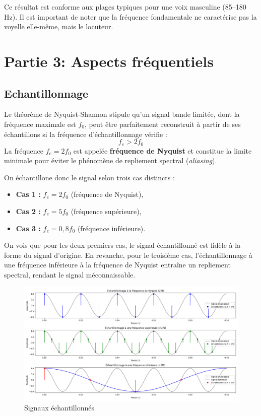 Ce résultat est conforme aux plages typiques pour une voix masculine (85–180 Hz). 
Il est important de noter que la fréquence fondamentale ne caractérise pas la voyelle elle-même, mais le locuteur.


\newpage
\section{Partie 3: Aspects fréquentiels}
\subsection{Echantillonnage}


Le théorème de Nyquist-Shannon stipule qu’un signal bande limitée, dont la fréquence maximale est $f_0$, peut être parfaitement reconstruit à partir de ses échantillons si la fréquence d’échantillonnage vérifie :
\[
f_e > 2 f_0
\]
La fréquence $f_e = 2 f_0$ est appelée \textbf{fréquence de Nyquist} et constitue la limite minimale pour éviter le phénomène de repliement spectral (\textit{aliasing}).

On échantillone donc le signal selon trois cas distincts :

\begin{itemize}
    \item \textbf{Cas 1 :} $f_e = 2f_0$ (fréquence de Nyquist),
    \item \textbf{Cas 2 :} $f_e = 5f_0$ (fréquence supérieure),
    \item \textbf{Cas 3 :} $f_e = 0{,}8f_0$ (fréquence inférieure).
\end{itemize}

On vois que pour les deux premiers cas, le signal échantillonné est fidèle à la forme du signal d’origine. En revanche, pour le troisième cas, l’échantillonnage à une fréquence inférieure à la fréquence de Nyquist entraîne un repliement spectral, rendant le signal méconnaissable.
\begin{figure}[h!]
    \centering
    \includegraphics[width=17cm]{screenshots/echantillonage_partie3.png}
    \caption{Signaux échantillonnés}
\end{figure}

